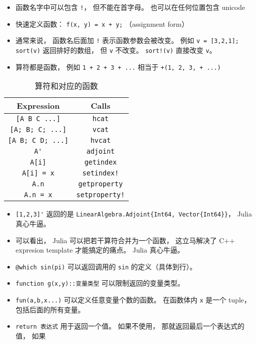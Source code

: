
\begin{issues}
\issueDraft
\end{issues}

\begin{itemize}
\item 函数名字中可以包含 \verb|!|， 但不能在首字母。 也可以在任何位置包含 unicode
\item 快速定义函数： \verb|f(x, y) = x + y;| （assignment form）
\item 通常来说， 函数名后面加 \verb|!| 表示函数参数会被改变。 例如 \verb|v = [3,2,1]; sort(v)| 返回排好的数组， 但 \verb|v| 不改变。 \verb|sort!(v)| 直接改变 \verb|v|。
\item 算符都是函数， 例如 \verb|1 + 2 + 3 + ...| 相当于 \verb|+(1, 2, 3, + ...)|
\end{itemize}


\begin{table}[ht]
\centering
\caption{算符和对应的函数}\label{JuFunc_tab1}
\begin{tabular}{|c|c|}
\hline
Expression & Calls \\
\hline
\verb|[A B C ...]| & \verb|hcat| \\
\hline
\verb|[A; B; C; ...]| & \verb|vcat| \\
\hline
\verb|[A B; C D; ...]| & \verb|hvcat| \\
\hline
\verb|A'| & \verb|adjoint| \\
\hline
\verb|A[i]| & \verb|getindex| \\
\hline
\verb|A[i] = x| & \verb|setindex!| \\
\hline
\verb|A.n| & \verb|getproperty| \\
\hline
\verb|A.n = x| & \verb|setproperty!| \\
\hline
\end{tabular}
\end{table}

\begin{itemize}
\item \verb|[1,2,3]'| 返回的是 \verb|LinearAlgebra.Adjoint{Int64, Vector{Int64}}|， Julia 真心牛逼。
\item 可以看出， Julia 可以把若干算符合并为一个函数， 这立马解决了 C++ expresion template 才能搞定的痛点。 Julia 真心牛逼。
\item \verb|@which sin(pi)| 可以返回调用的 \verb|sin| 的定义（具体到行）。
\item \verb|function g(x,y)::变量类型| 可以限制返回的变量类型。
\item \verb|fun(a,b,x...)| 可以定义任意变量个数的函数。 在函数体内 \verb|x| 是一个 tuple， 包括后面的所有变量。
\item \verb|return 表达式| 用于返回一个值。 如果不使用， 那就返回最后一个表达式的值， 如果
\end{itemize}

